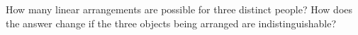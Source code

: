 How many linear arrangements are possible for three distinct people? How does the answer change if the three objects being arranged are indistinguishable?
